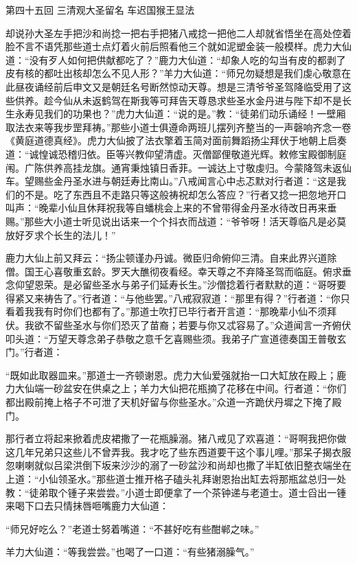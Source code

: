 \documentclass[12pt,UTF8]{ctexbook}
\begin{document}
第四十五回 三清观大圣留名 车迟国猴王显法

却说孙大圣左手把沙和尚捻一把右手把猪八戒捻一把他二人却就省悟坐在高处倥着脸不言不语凭那些道士点灯着火前后照看他三个就如泥塑金装一般模样。虎力大仙道：“没有歹人如何把供献都吃了？”鹿力大仙道：“却象人吃的勾当有皮的都剥了皮有核的都吐出核却怎么不见人形？”羊力大仙道：“师兄勿疑想是我们虔心敬意在此昼夜诵经前后申文又是朝廷名号断然惊动天尊。想是三清爷爷圣驾降临受用了这些供养。趁今仙从未返鹤驾在斯我等可拜告天尊恳求些圣水金丹进与陛下却不是长生永寿见我们的功果也？”虎力大仙道：“说的是。”教：“徒弟们动乐诵经！一壁厢取法衣来等我步罡拜祷。”那些小道士俱遵命两班儿摆列齐整当的一声磬响齐念一卷《黄庭道德真经》。虎力大仙披了法衣擎着玉简对面前舞蹈扬尘拜伏于地朝上启奏道：“诚惶诚恐稽归依。臣等兴教仰望清虚。灭僧鄙俚敬道光辉。敕修宝殿御制庭闱。广陈供养高挂龙旗。通宵秉烛镇日香菲。一诚达上寸敬虔归。今蒙降驾未返仙车。望赐些金丹圣水进与朝廷寿比南山。”八戒闻言心中忐忑默对行者道：“这是我们的不是。吃了东西且不走路只等这般祷祝却怎么答应？”行者又捻一把忽地开口叫声：“晚辈小仙且休拜祝我等自蟠桃会上来的不曾带得金丹圣水待改日再来垂赐。”那些大小道士听见说出话来一个个抖衣而战道：“爷爷呀！活天尊临凡是必莫放好歹求个长生的法儿！”

鹿力大仙上前又拜云：“扬尘顿谨办丹诚。微臣归命俯仰三清。自来此界兴道除僧。国王心喜敬重玄龄。罗天大醮彻夜看经。幸天尊之不弃降圣驾而临庭。俯求垂念仰望恩荣。是必留些圣水与弟子们延寿长生。”沙僧捻着行者默默的道：“哥呀要得紧又来祷告了。”行者道：“与他些罢。”八戒寂寂道：“那里有得？”行者道：“你只看着我我有时你们也都有了。”那道士吹打已毕行者开言道：“那晚辈小仙不须拜伏。我欲不留些圣水与你们恐灭了苗裔；若要与你又忒容易了。”众道闻言一齐俯伏叩头道：“万望天尊念弟子恭敬之意千乞喜赐些须。我弟子广宣道德奏国王普敬玄门。”行者道：

“既如此取器皿来。”那道士一齐顿谢恩。虎力大仙爱强就抬一口大缸放在殿上；鹿力大仙端一砂盆安在供桌之上；羊力大仙把花瓶摘了花移在中间。行者道：“你们都出殿前掩上格子不可泄了天机好留与你些圣水。”众道一齐跪伏丹墀之下掩了殿门。

那行者立将起来掀着虎皮裙撒了一花瓶臊溺。猪八戒见了欢喜道：“哥啊我把你做这几年兄弟只这些儿不曾弄我。我才吃了些东西道要干这个事儿哩。”那呆子揭衣服忽喇喇就似吕梁洪倒下坂来沙沙的溺了一砂盆沙和尚却也撒了半缸依旧整衣端坐在上道：“小仙领圣水。”那些道士推开格子磕头礼拜谢恩抬出缸去将那瓶盆总归一处教：“徒弟取个锺子来尝尝。”小道士即便拿了一个茶钟递与老道士。道士舀出一锺来喝下口去只情抹唇咂嘴鹿力大仙道：

“师兄好吃么？”老道士努着嘴道：“不甚好吃有些酣郸之味。”

羊力大仙道：“等我尝尝。”也喝了一口道：“有些猪溺臊气。”
\end{document}
